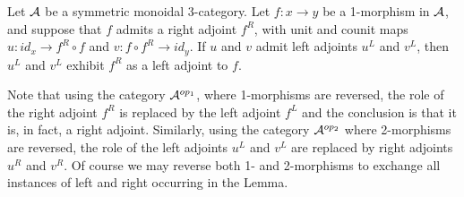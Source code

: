 \documentclass{amsart}
\begin{document}
\begin{lemma} \label{lem-ambiadjoints}
	Let $\mathcal A$ be a symmetric monoidal 3-category. Let $f: x \to y$ be a 1-morphism in $\mathcal A$, and suppose that $f$ admits a right adjoint $f^R$,  with unit and counit maps $u:id_x \to f^R \circ f$ and $v:f \circ f^R \to id_y$. If $u$ and $v$ admit left adjoints $u^L$ and $v^L$, then $u^L$ and $v^L$ exhibit $f^R$ as a left adjoint to $f$. 
\end{lemma}
\noindent Note that using the category $\mathcal A^{op_1}$, where 1-morphisms are reversed, the role of the right adjoint $f^R$ is replaced by the left adjoint $f^L$ and the conclusion is that it is, in fact, a right adjoint.  Similarly, using the category $\mathcal A^{op_2}$ where 2-morphisms are reversed, the role of the left adjoints $u^L$ and $v^L$ are replaced by right adjoints $u^R$ and $v^R$.  Of course we may reverse both 1- and 2-morphisms to exchange all instances of left and right occurring in the Lemma.
\end{document}
